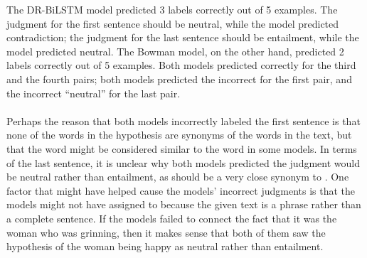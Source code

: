 \documentclass[12pt,letterpaper]{article}
\begin{document}
The DR-BiLSTM model predicted 3 labels correctly out of 5 examples. The judgment for the first sentence should be neutral, while the model predicted contradiction; the judgment for the last sentence should be entailment, while the model predicted neutral. The Bowman model, on the other hand, predicted 2 labels correctly out of 5 examples. Both models predicted correctly for the third and the fourth pairs; both models predicted the incorrect  for the first pair, and the incorrect “neutral” for the last pair. \\
\\
Perhaps the reason that both models incorrectly labeled the first sentence is that none of the words in the hypothesis are synonyms of the words in the text, but that the word  might be considered similar to the word  in some models. In terms of the last sentence, it is unclear why both models predicted the judgment would be neutral rather than entailment, as  should be a very close synonym to . One factor that might have helped cause the models' incorrect judgments is that the models might not have assigned  to  because the given text is a phrase rather than a complete sentence. If the models failed to connect the fact that it was the woman who was grinning, then it makes sense that both of them saw the hypothesis of the woman being happy as neutral rather than entailment.
\end{document}
